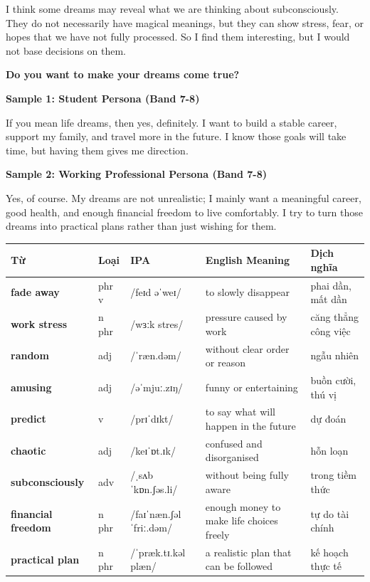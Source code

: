 I think some dreams may reveal what we are thinking about subconsciously. They do not necessarily have magical meanings, but they can show stress, fear, or hopes that we have not fully processed. So I find them interesting, but I would not base decisions on them.

\separator

\begin{ieltsquestion}
\textbf{Do you want to make your dreams come true?}
\end{ieltsquestion}
\textbf{Sample 1: Student Persona (Band 7-8)}

If you mean life dreams, then yes, definitely. I want to build a stable career, support my family, and travel more in the future. I know those goals will take time, but having them gives me direction.

\textbf{Sample 2: Working Professional Persona (Band 7-8)}

Yes, of course. My dreams are not unrealistic; I mainly want a meaningful career, good health, and enough financial freedom to live comfortably. I try to turn those dreams into practical plans rather than just wishing for them.

\separator


\vspace{0.8em}
\begin{center}
\renewcommand{\arraystretch}{1.65}
\begin{tabularx}{\textwidth}{|V{0.22\textwidth}|C{0.07\textwidth}|I{0.20\textwidth}|Y|V{0.18\textwidth}|}
\hline
{}
\textbf{Từ} & \textbf{Loại} & \textbf{IPA} & \textbf{English Meaning} & \textbf{Dịch nghĩa} \\
\hline
\textbf{fade away} & phr v & /feɪd əˈweɪ/ & to slowly disappear & phai dần, mất dần \\ \hline
\textbf{work stress} & n phr & /wɜːk stres/ & pressure caused by work & căng thẳng công việc \\ \hline
\textbf{random} & adj & /ˈræn.dəm/ & without clear order or reason & ngẫu nhiên \\ \hline
\textbf{amusing} & adj & /əˈmjuː.zɪŋ/ & funny or entertaining & buồn cười, thú vị \\ \hline
\textbf{predict} & v & /prɪˈdɪkt/ & to say what will happen in the future & dự đoán \\ \hline
\textbf{chaotic} & adj & /keɪˈɒt.ɪk/ & confused and disorganised & hỗn loạn \\ \hline
\textbf{subconsciously} & adv & /ˌsʌbˈkɒn.ʃəs.li/ & without being fully aware & trong tiềm thức \\ \hline
\textbf{financial freedom} & n phr & /faɪˈnæn.ʃəl ˈfriː.dəm/ & enough money to make life choices freely & tự do tài chính \\ \hline
\textbf{practical plan} & n phr & /ˈpræk.tɪ.kəl plæn/ & a realistic plan that can be followed & kế hoạch thực tế \\ \hline
\end{tabularx}
\end{center}

